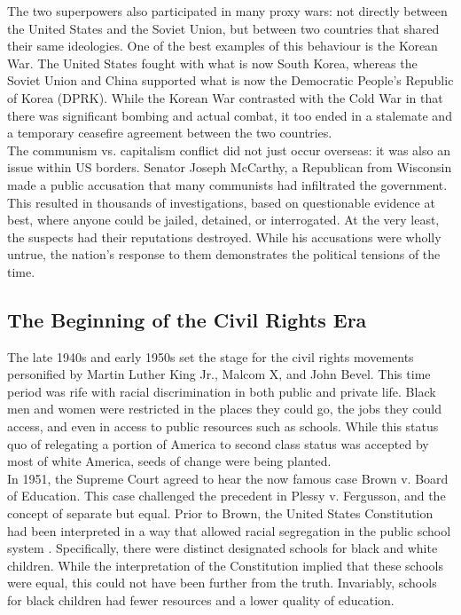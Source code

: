 \documentclass[12pt]{article}
\begin{document}
The two superpowers also participated in many proxy wars: not directly between the United States and the Soviet Union, but between two countries that shared their same ideologies\cite{18}. One of the best examples of this behaviour is the Korean War. The United States fought with what is now South Korea, whereas the Soviet Union and China supported what is now the Democratic People's Republic of Korea (DPRK)\cite{19}. While the Korean War contrasted with the Cold War in that there was significant bombing and actual combat, it too ended in a stalemate and a temporary ceasefire agreement between the two countries\cite{19}.\\

The communism vs. capitalism conflict did not just occur overseas: it was also an issue within US borders. Senator Joseph McCarthy, a Republican from Wisconsin made a public accusation that many communists had infiltrated the government\cite{20}. This resulted in thousands of investigations, based on questionable evidence at best, where anyone could be jailed, detained, or interrogated. At the very least, the suspects had their reputations destroyed\cite{20}. While his accusations were wholly untrue, the nation's response to them demonstrates the political tensions of the time.

\subsection{The Beginning of the Civil Rights Era}

The late 1940s and early 1950s set the stage for the civil rights movements personified by Martin Luther King Jr., Malcom X, and John Bevel. This time period was rife with racial discrimination in both public and private life. Black men and women were restricted in the places they could go, the jobs they could access, and even in access to public resources such as schools. While this status quo of relegating a portion of America to second class status was accepted by most of white America, seeds of change were being planted.\\

In 1951, the Supreme Court agreed to hear the now famous case Brown v. Board of Education. This case challenged the precedent in Plessy v. Fergusson, and the concept of separate but equal. Prior to Brown, the United States Constitution had been interpreted in a way that allowed racial segregation in the public school system \cite{21}. Specifically, there were distinct designated schools for black and white children. While the interpretation of the Constitution implied that these schools were equal, this could not have been further from the truth. Invariably, schools for black children had fewer resources and a lower quality of education.\\
\end{document}
